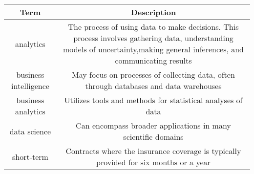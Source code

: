 \documentclass[]{book}
\theoremstyle{definition}
\theoremstyle{definition}
\theoremstyle{definition}
\theoremstyle{remark}
\begin{document}
\begin{longtable}[]{@{}cc@{}}
\toprule
\begin{minipage}[b]{0.41\columnwidth}\centering\strut
Term\strut
\end{minipage} & \begin{minipage}[b]{0.42\columnwidth}\centering\strut
Description\strut
\end{minipage}\tabularnewline
\midrule
\endhead
\begin{minipage}[t]{0.41\columnwidth}\centering\strut
analytics\strut
\end{minipage} & \begin{minipage}[t]{0.42\columnwidth}\centering\strut
The process of using data to make decisions. This process involves
gathering data, understanding models of uncertainty,making general
inferences, and communicating results\strut
\end{minipage}\tabularnewline
\begin{minipage}[t]{0.41\columnwidth}\centering\strut
business intelligence\strut
\end{minipage} & \begin{minipage}[t]{0.42\columnwidth}\centering\strut
May focus on processes of collecting data, often through databases and
data warehouses\strut
\end{minipage}\tabularnewline
\begin{minipage}[t]{0.41\columnwidth}\centering\strut
business analytics\strut
\end{minipage} & \begin{minipage}[t]{0.42\columnwidth}\centering\strut
Utilizes tools and methods for statistical analyses of data\strut
\end{minipage}\tabularnewline
\begin{minipage}[t]{0.41\columnwidth}\centering\strut
data science\strut
\end{minipage} & \begin{minipage}[t]{0.42\columnwidth}\centering\strut
Can encompass broader applications in many scientific domains\strut
\end{minipage}\tabularnewline
\begin{minipage}[t]{0.41\columnwidth}\centering\strut
short-term\strut
\end{minipage} & \begin{minipage}[t]{0.42\columnwidth}\centering\strut
Contracts where the insurance coverage is typically provided for six
months or a year\strut
\end{minipage}\tabularnewline

\end{longtable}
\end{document}

